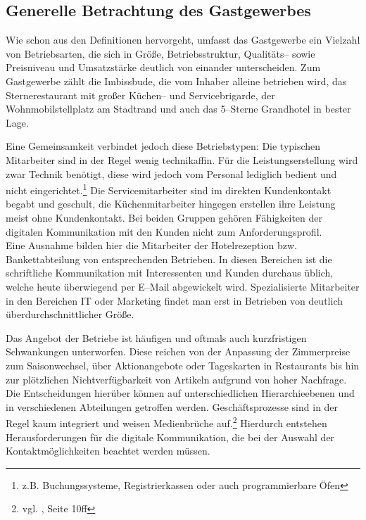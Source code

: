 \subsection{Generelle Betrachtung des Gastgewerbes} %
\label{sec:generelltouri}
Wie schon aus den Definitionen hervorgeht, umfasst das Gastgewerbe ein Vielzahl von Betriebsarten, die sich in Größe, Betriebsstruktur, Qualitäts– sowie Preisniveau und Umsatzstärke deutlich von einander unterscheiden. Zum Gastgewerbe zählt die Imbissbude, die vom Inhaber alleine betrieben wird, das Sternerestaurant mit großer Küchen– und Servicebrigarde, der Wohnmobilstellplatz am Stadtrand und auch das 5–Sterne Grandhotel in bester Lage.

Eine Gemeinsamkeit verbindet jedoch diese Betriebstypen: Die typischen Mitarbeiter sind in der Regel wenig technikaffin. Für die Leistungserstellung wird zwar Technik benötigt, diese wird jedoch vom Personal lediglich bedient und nicht eingerichtet.\footnote{z.B. Buchungssysteme, Registrierkassen oder auch programmierbare Öfen} Die Servicemitarbeiter sind im direkten Kundenkontakt begabt und geschult, die Küchenmitarbeiter hingegen erstellen ihre Leistung meist ohne Kundenkontakt. Bei beiden Gruppen gehören Fähigkeiten der digitalen Kommunikation mit den Kunden nicht zum Anforderungsprofil.\\
Eine Ausnahme bilden hier die Mitarbeiter der Hotelrezeption bzw. Bankettabteilung von entsprechenden Betrieben. In diesen Bereichen ist die schriftliche Kommunikation mit Interessenten und Kunden durchaus üblich, welche heute überwiegend per E–Mail abgewickelt wird. 
Spezialisierte Mitarbeiter in den Bereichen IT oder Marketing findet man erst in Betrieben von deutlich überdurchschnittlicher Größe. 

Das Angebot der Betriebe ist häufigen und oftmals auch kurzfristigen Schwankungen unterworfen. Diese reichen von der Anpassung der Zimmerpreise zum Saisonwechsel, über Aktionangebote oder Tageskarten in Restaurants bis hin zur plötzlichen Nichtverfügbarkeit von Artikeln aufgrund von hoher Nachfrage. Die Entscheidungen hierüber können auf unterschiedlichen Hierarchieebenen und in verschiedenen Abteilungen getroffen werden. Geschäftsprozesse sind in der Regel kaum integriert und weisen Medienbrüche auf.\footnote{vgl. \cite{waidele:integration}, Seite 10ff} Hierdurch entstehen Herausforderungen für die digitale Kommunikation, die bei der Auswahl der Kontaktmöglichkeiten beachtet werden müssen.

